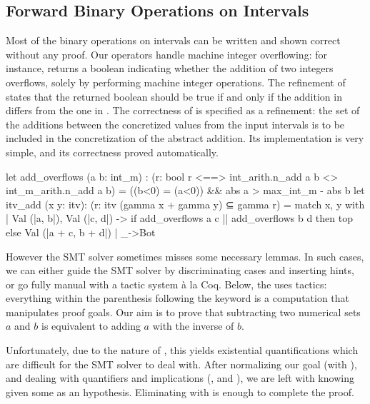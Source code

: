 \documentclass{llncs}
\begin{document}
\subsection{Forward Binary Operations on Intervals}
\label{abint:sub:forward-op-itv}
%
Most of the binary operations on intervals can be written and
shown correct without any proof. Our operators handle machine
integer overflowing: for instance,  returns a
boolean indicating whether the addition of two integers overflows,
solely by performing machine integer operations.
%
The refinement of  states that the returned
boolean  should be true if and only if the addition in
 differs from the one in .
%
The correctness of  is specified as a refinement:
the set of the additions between the concretized values from the
input intervals is to be included in the concretization of the
abstract addition.
%
Its implementation is very simple, and its correctness proved
automatically.
%
\begin{fstarcode}
let add_overflows (a b: int_m)
  : (r: bool {r <==> int_arith.n_add a b <> int_m_arith.n_add a b})
  = ((b<0) = (a<0)) && abs a > max_int_m - abs b
let itv_add (x y: itv): (r: itv {(gamma x + gamma y) ⊆ gamma r})
  = match x, y with | Val (|a, b|), Val (|c, d|)
                    -> if add_overflows a c || add_overflows b d
                      then top else Val (|a + c, b + d|) | _->Bot
\end{fstarcode}
%
However the SMT solver sometimes misses some necessary lemmas.
%
In such cases, we can either guide the SMT solver by
discriminating cases and inserting hints, or go fully manual with
a tactic system à la Coq.
%
Below, the  uses tactics: everything within the
parenthesis following the  keyword is a computation that
manipulates proof goals.
%
Our aim is to prove that subtracting two numerical sets $a$ and
$b$ is equivalent to adding $a$ with the inverse of $b$.

\sloppy Unfortunately, due to the nature of ,
this yields existential quantifications which are difficult for
the SMT solver to deal with. After normalizing our goal (with
), and dealing with quantifiers and implications
(,  and
), we are left with
%
%
knowing  given some  as an
hypothesis.
%
Eliminating  with  is enough to complete the
proof.
\end{document}

